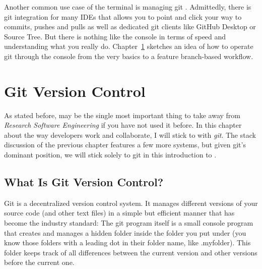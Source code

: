 \documentclass[
  12pt,
  letterpaper,
]{krantz}
\begin{document}
Another common use case of the terminal is managing git
. Admittedly, there is git integration for many
IDEs that allows you to point and click your way to commits, pushes and
pulls as well as dedicated git clients like GitHub Desktop
or Source Tree. But there is nothing like the console in terms of speed
and understanding what you really do. Chapter~\ref{sec-git} sketches an
idea of how to operate git through the console from the very basics to a
feature branch-based workflow.


\hypertarget{sec-git}{%
\chapter{Git Version Control}\label{sec-git}}

As stated before,  may be the single most
important thing to take away from \emph{Research Software Engineering}
if you have not used it before. In this chapter about the way developers
work and collaborate, I will stick to  with
\emph{git}. The stack discussion of the previous chapter
features a few more  systems, but given git's
dominant position, we will stick solely to git in this introduction to
.

\hypertarget{what-is-git-version-control}{%
\section{What Is Git Version
Control?}\label{what-is-git-version-control}}

Git is a decentralized version control system. It manages
different versions of your source code (and other text files) in a
simple but efficient manner that has become the industry standard: The
git program itself is a small console program that creates and manages a
hidden folder inside the folder you put under 
(you know those folders with a leading dot in their folder name, like
.myfolder). This folder keeps track of all differences between the
current version and other versions before the current one.
\end{document}
